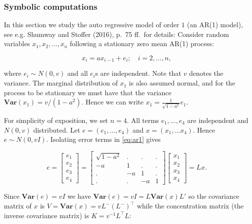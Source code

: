 \hypertarget{symbolic-computations}{%
\subsubsection{Symbolic computations}\label{symbolic-computations}}

In this section we study the auto regressive model of order \(1\) (an AR(1) model), see
e.g. Shumway and Stoﬀer (2016), p.~75 ff.~for details:
Consider random variables \(x_1, x_2, \dots, x_n\) following a stationary zero mean AR(1) process:

\begin{equation}
  x_i = a x_{i-1} + e_i; \quad i=2, \dots, n,
  \label{eq:ar1}
\end{equation}

where \(e_i \sim N(0, v)\) and all \(e_i\)s are independent. Note that \(v\) denotes the variance.
The marginal distribution of \(x_1\) is also assumed normal, and for the process to be stationary
we must have that the variance \(\mathbf{Var}(x_1) = v / (1-a^2)\).
Hence we can write \(x_1 = \frac 1 {\sqrt{1-a^2}} e_1\).

For simplicity of exposition, we set \(n=4\). All terms \(e_1, \dots, e_4\) are independent and \(N(0, v)\) distributed. Let \(e=(e_1, \dots, e_4)\) and \(x=(x_1, \dots x_4)\). Hence \(e \sim N(0, v I)\). Isolating
error terms in \eqref{eq:ar1} gives

\[
  e= \left[\begin{matrix}e_{1}\\e_{2}\\e_{3}\\e_{4}\end{matrix}\right] = \left[\begin{matrix}\sqrt{1 - a^{2}} & . & . & .\\- a & 1 & . & .\\. & - a & 1 & .\\. & . & - a & 1\end{matrix}\right] \left[\begin{matrix}x_{1}\\x_{2}\\x_{3}\\x_{4}\end{matrix}\right] = L x  .
\]

Since
\(\mathbf{Var}(e)=v I\) we have \(\mathbf{Var}(e)=v I=L \mathbf{Var}(x) L'\) so the covariance matrix of \(x\) is \(V=\mathbf{Var}(x) = v L^- (L^-)^\top\) while the concentration matrix (the inverse covariance
matrix) is \(K=v^{-1}L^\top L\):


